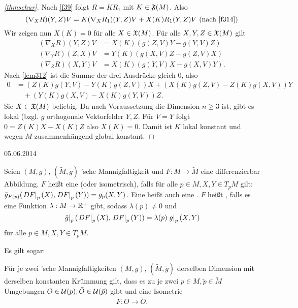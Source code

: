 \documentclass{article}
\begin{document}
\begin{proof}[\autoref{thmschur}] Nach \autoref{f39} folgt $R = K R_1$ mit $K\in\mathfrak{F}(M)$. Also
    $$
    (\nabla_X R)(Y,Z) V = K(\nabla_X R_1)(Y,Z) V + X(K) R_1(Y,Z) V \ \textrm{(nach \autoref{f314})}
    $$
    Wir zeigen nun $X(K)=0$ für alle $X\in\mathfrak{X}(M)$. Für alle $X,Y,Z\in\mathfrak{X}(M)$ gilt
    \begin{align*}
        (\nabla_X R)(Y,Z) V &= X(K)(g(Z,V)Y-g(Y,V)Z)\\
        (\nabla_Y R)(Z,X) V &= Y(K)(g(X,V)Z-g(Z,V)X)\\
        (\nabla_Z R)(X,Y) V &= X(K)(g(Y,V)X-g(X,V)Y).
    \end{align*}
    Nach \autoref{lem312} ist die Summe der drei Ausdrücke gleich 0, also
    \begin{align*}
        0 &= (Z(K)g(Y,V)-Y(K)g(Z,V))X+(X(K)g(Z,V)-Z(K)g(X,V))Y\\
        &\quad +(Y(K)g(X,V)-X(K)g(Y,V))Z.
    \end{align*}
    Sie $X\in\mathfrak{X}(M)$ beliebig. Da nach Voraussetzung die Dimension $n\geq 3$ ist, gibt es lokal (bzgl. $g$ orthogonale Vektorfelder $Y,Z$. Für $V=Y$ folgt $0=Z(K)X-X(K)Z$ also $X(K)=0$. Damit ist $K$ lokal konstant und wegen $M$ zusammenhängend global konstant.   
\end{proof}

\hfill{05.06.2014}

\begin{definition}
    Seien $(M,g)$, $(\tilde M, \tilde g)$ 'sche Mannigfaltigkeit und $F:M\to\tilde M$ eine differenzierbar Abbildung. $F$ heißt eine  (oder isometrisch), falls für alle $p\in M, X,Y\in T_p M$ gilt: $\tilde g_{F(p)}(\left. DF\right\vert_p(X),\left. DF\right\vert_p(Y))=g_p(X,Y)$. Eine  heißt auch eine . $F$ heißt , falls es eine Funktion $\lambda:M\rightarrow \mathbb{R}^+$ gibt, sodass $\lambda(p)\neq 0$ und
    $$
    \left. \tilde g\right\vert_p(\left. DF\right\vert_p(X),\left. DF\right\vert_p(Y))=\lambda(p)\left. g\right\vert_p(X,Y)
    $$
    für alle $p\in M, X,Y\in T_p M$.
\end{definition}

Es gilt sogar:

\begin{theorem}
    Für je zwei 'sche Mannigfaltigkeiten $(M,g)$, $(\tilde M, \tilde g)$ derselben Dimension mit derselben konstanten Krümmung gilt, dass es zu je zwei $p\in M, \tilde p\in\tilde M$ Umgebungen $O\in\mathcal{U}(p), \tilde O\in\mathcal{U}(\tilde p)$ gibt und eine Isometrie
    $$
    F:O\to \tilde O.
    $$
\end{theorem}
\end{document}
